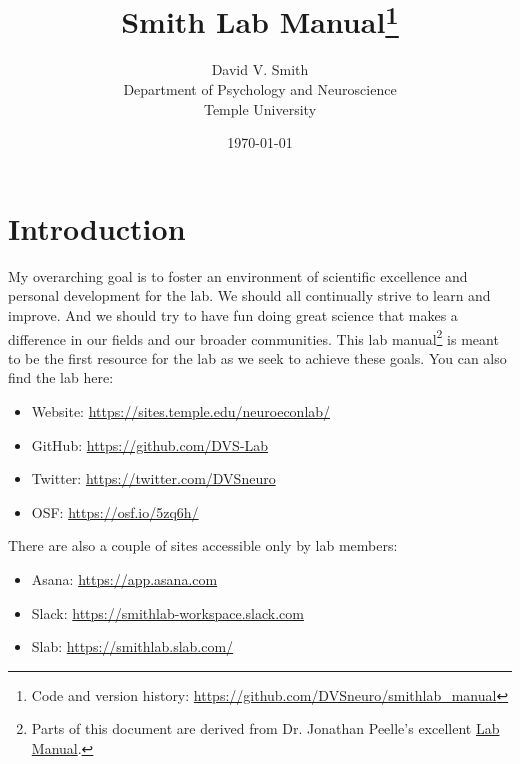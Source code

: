 \documentclass[letterpaper,11pt,oneside]{memoir}
\begin{document}
\title{Smith Lab Manual\thanks{Code and version history: \url{https://github.com/DVSneuro/smithlab_manual}}}
\author{David V. Smith\\Department of Psychology and Neuroscience\\Temple University}
\date{\today}


\maketitle

\pagestyle{titlingpage}


\cleardoublepage
\frontmatter
\tableofcontents
\cleardoublepage

\mainmatter

\pagestyle{headings}

\chapter{Introduction}
My overarching goal is to foster an environment of scientific excellence and personal development for the lab. We should all continually strive to learn and improve. And we should try to have fun doing great science that makes a difference in our fields and our broader communities. This lab manual\footnote{Parts of this document are derived from Dr. Jonathan Peelle's excellent \href{https://github.com/jpeelle/peellelab\_manual/}{Lab Manual}.} is meant to be the first resource for the lab as we seek to achieve these goals. You can also find the lab here:

\begin{itemize}[noitemsep]
\item Website: \url{https://sites.temple.edu/neuroeconlab/}
\item GitHub: \url{https://github.com/DVS-Lab}
\item Twitter: \url{https://twitter.com/DVSneuro}
\item OSF: \url{https://osf.io/5zq6h/}
\end{itemize}

\noindent There are also a couple of sites accessible only by lab members:

\begin{itemize}[noitemsep]
\item Asana: \url{https://app.asana.com}
\item Slack: \url{https://smithlab-workspace.slack.com}
\item Slab: \url{https://smithlab.slab.com/}
\end{itemize}
\end{document}
